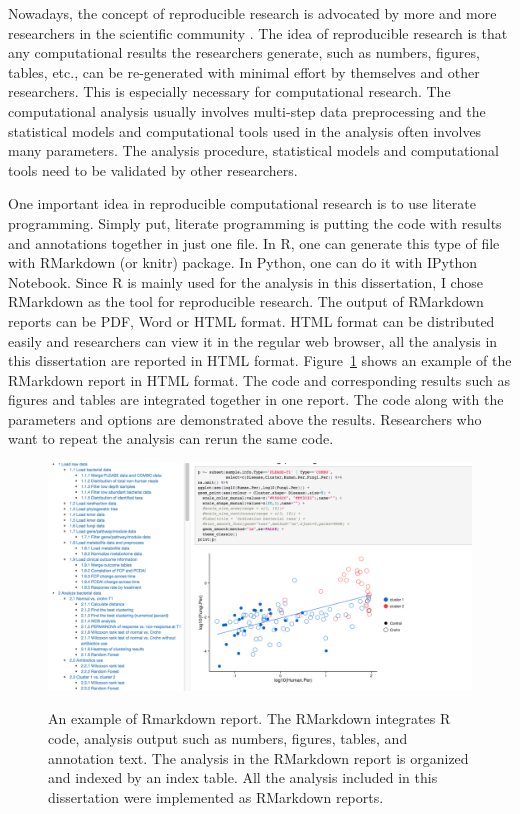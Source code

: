 \label{chpt:repro}

Nowadays, the concept of reproducible research is advocated by more and more researchers in the scientific community \citep{Peng:2011et, Sandve:2013gh}. The idea of reproducible research is that any computational results the researchers generate, such as numbers, figures, tables, etc., can be re-generated with minimal effort by themselves and other researchers. This is especially necessary for computational research. The computational analysis usually involves  multi-step data preprocessing and the statistical models and computational tools used in the analysis often involves many parameters.   The analysis procedure, statistical models and computational tools need to be validated by other researchers. 

One important idea in reproducible computational research is to use literate programming. Simply put, literate programming is putting the code with results and annotations together in just one file. In R, one can generate this type of file with RMarkdown (or knitr) package. In Python, one can do it with IPython Notebook. Since R is mainly used for the analysis in this dissertation, I chose RMarkdown as the tool for reproducible research. The output of RMarkdown reports can be PDF, Word or HTML format. HTML format can be distributed easily and researchers can view it in the regular web browser, all the analysis  in this dissertation are reported in HTML format. Figure~\ref{F61_Reproducible_Research} shows an example of the RMarkdown report in HTML format. The code and corresponding results such as figures and tables are integrated together in one report. The code along with the parameters and options are demonstrated above the results. Researchers who want to repeat the analysis can rerun the same code.



\begin{figure}[p]
	\centering
	{\includegraphics[scale=0.4,trim=0 0 0 0,clip]{Figure/F61_Reproducible_Research.pdf}}
	\caption[An example of RMarkdown report]{An example of Rmarkdown report. The RMarkdown integrates R code, analysis output such as numbers, figures, tables, and annotation text. The analysis in the RMarkdown report is organized and indexed by an index table.  All the analysis included in this dissertation were implemented as RMarkdown reports.
	}
	\label{F61_Reproducible_Research}
\end{figure}


